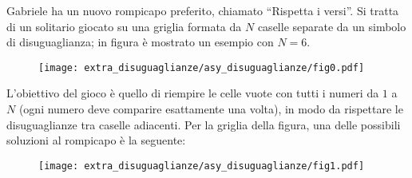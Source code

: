 \usepackage{xcolor}
\usepackage{afterpage}
\usepackage{pifont,mdframed}
\usepackage[bottom]{footmisc}
\usepackage{algorithm}
\usepackage[noend]{algpseudocode}
\usepackage[colorlinks = true,linkcolor = black,urlcolor  = blue,citecolor = black,anchorcolor = black]{hyperref}


\newcommand{\inputfile}{\texttt{input.txt}}
\newcommand{\outputfile}{\texttt{output.txt}}

\newenvironment{warning}
  {\par\begin{mdframed}[linewidth=2pt,linecolor=gray]%
    \begin{list}{}{\leftmargin=1cm
                   \labelwidth=\leftmargin}\item[\Large\ding{43}]}
  {\end{list}\end{mdframed}\par}


	{
	\vspace{-.95cm}\hfill{}
	}
	\vspace{.5cm}

	Gabriele ha un nuovo rompicapo preferito, chiamato ``Rispetta i versi''. Si tratta di un solitario giocato su una griglia formata da $N$ caselle separate da un simbolo di disuguaglianza; in figura è mostrato un esempio con $N = 6$.
	
	\vspace{-1mm}
	\begin{figure}[h]
	\centering\colorbox{black!10!white}{
		\texttt{[image: extra\_disuguaglianze/asy\_disuguaglianze/fig0.pdf]}
	}
	\end{figure}

	L'obiettivo del gioco è quello di riempire le celle vuote con tutti i numeri da $1$ a $N$ (ogni numero deve comparire esattamente una volta), in modo da rispettare le disuguaglianze tra caselle adiacenti. Per la griglia della figura, una delle possibili soluzioni al rompicapo è la seguente:
	
	\vspace{-1mm}
	\begin{figure}[h]
	\centering\colorbox{black!10!white}{
		\texttt{[image: extra\_disuguaglianze/asy\_disuguaglianze/fig1.pdf]}
	}
	\end{figure}
	\vspace{-1mm}
	
